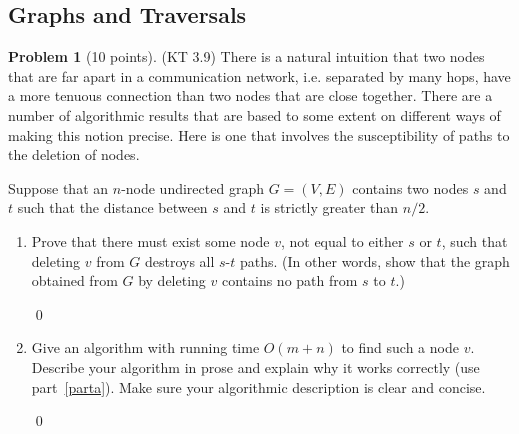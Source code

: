 \documentclass[12pt]{article}
\theoremstyle{definition}
\newtheorem{question}{Problem}
\newenvironment{solution}{\bigskip\noindent{\em Solution.}  \ignorespaces}{\hfill\qed}
\begin{document}
\newpage


\subsection*{Graphs and Traversals}
\begin{question}[10 points]
(KT 3.9) There is a natural intuition that two nodes that are far apart in a communication network, i.e. separated by many hops, have a more tenuous connection than two nodes that are close together. There are a number of algorithmic results that are based to some extent on different ways of making this notion precise. Here is one that involves the susceptibility of paths to the deletion of nodes.

Suppose that an $n$-node undirected graph $G = (V, E)$ contains two nodes $s$ and $t$ such that the distance between $s$ and $t$ is strictly greater than $n/2$.
\begin{enumerate}[label=(\alph*)]
    \item\label{parta} Prove that there must exist some node $v$, not equal to either $s$ or $t$, such that deleting $v$ from $G$ destroys all $s$-$t$ paths. (In other words, show that the graph obtained from $G$ by deleting $v$ contains no path from $s$ to $t$.)
    
    \begin{solution}
    
    \end{solution}

    \item Give an algorithm with running time $O(m + n)$ to find such a node $v$. Describe your algorithm in prose and explain why it works correctly (use part~\ref{parta}). Make sure your algorithmic description is clear and concise. 
    
    \begin{solution}
    
    \end{solution}
\end{enumerate}
\end{question}

\newpage
\end{document}
